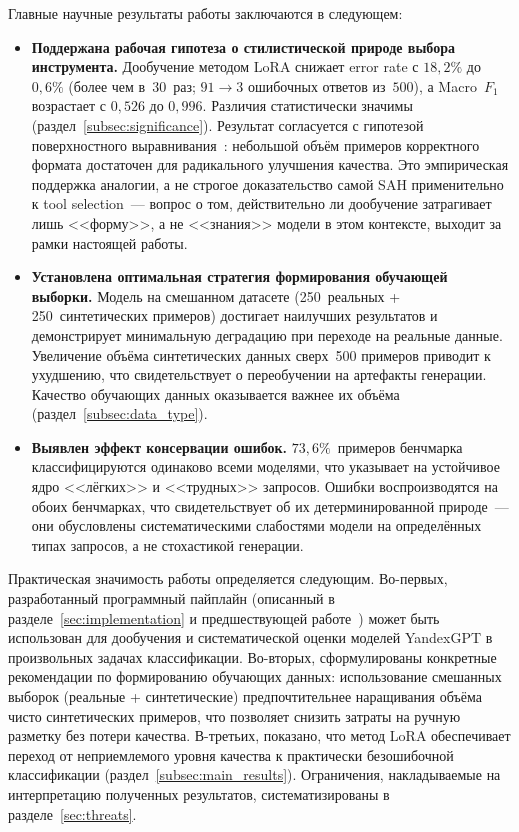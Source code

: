 Главные научные результаты работы заключаются в следующем:
\begin{itemize}
    \item \textbf{Поддержана рабочая гипотеза о стилистической природе выбора инструмента.} Дообучение методом LoRA снижает error rate с $18{,}2\%$ до $0{,}6\%$ (более чем в~$30$~раз; $91 \to 3$ ошибочных ответов из~$500$), а Macro~$F_1$ возрастает с $0{,}526$ до $0{,}996$. Различия статистически значимы (раздел~\ref{subsec:significance}). Результат согласуется с гипотезой поверхностного выравнивания~\cite{zhou2023lima}: небольшой объём примеров корректного формата достаточен для радикального улучшения качества. Это эмпирическая поддержка аналогии, а не строгое доказательство самой SAH применительно к tool selection~--- вопрос о том, действительно ли дообучение затрагивает лишь <<форму>>, а не <<знания>> модели в этом контексте, выходит за рамки настоящей работы.

    \item \textbf{Установлена оптимальная стратегия формирования обучающей выборки.} Модель на смешанном датасете (250~реальных + 250~синтетических примеров) достигает наилучших результатов и демонстрирует минимальную деградацию при переходе на реальные данные. Увеличение объёма синтетических данных сверх~500 примеров приводит к ухудшению, что свидетельствует о переобучении на артефакты генерации. Качество обучающих данных оказывается важнее их объёма (раздел~\ref{subsec:data_type}).

    \item \textbf{Выявлен эффект консервации ошибок.} $73{,}6\%$~примеров бенчмарка классифицируются одинаково всеми моделями, что указывает на устойчивое ядро <<лёгких>> и <<трудных>> запросов. Ошибки воспроизводятся на обоих бенчмарках, что свидетельствует об их детерминированной природе~--- они обусловлены систематическими слабостями модели на определённых типах запросов, а не стохастикой генерации.
\end{itemize}

Практическая значимость работы определяется следующим. Во-первых, разработанный программный пайплайн (описанный в разделе~\ref{sec:implementation} и предшествующей работе~\cite{goroshko2025otchet}) может быть использован для дообучения и систематической оценки моделей YandexGPT в произвольных задачах классификации. Во-вторых, сформулированы конкретные рекомендации по формированию обучающих данных: использование смешанных выборок (реальные + синтетические) предпочтительнее наращивания объёма чисто синтетических примеров, что позволяет снизить затраты на ручную разметку без потери качества. В-третьих, показано, что метод LoRA обеспечивает переход от неприемлемого уровня качества к практически безошибочной классификации (раздел~\ref{subsec:main_results}). Ограничения, накладываемые на интерпретацию полученных результатов, систематизированы в разделе~\ref{sec:threats}.

